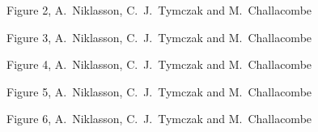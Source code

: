 \commentoutA{\documentclass[prb,aps,twocolumn,showpacs,twocolumngrid,superbib]{revtex4}}
\begin{document}
{\clearpage

\begin{center}
Figure 2, A.~Niklasson,  C.~J.~Tymczak and M.~Challacombe \\[1.cm]
\end{center}

\clearpage

\begin{center}
Figure 3, A.~Niklasson,  C.~J.~Tymczak and M.~Challacombe \\[1.cm]
\end{center}

\clearpage

\begin{center}
Figure 4, A.~Niklasson,  C.~J.~Tymczak and M.~Challacombe \\[1.cm]
\end{center}

\clearpage

\begin{center}
Figure 5, A.~Niklasson,  C.~J.~Tymczak and M.~Challacombe \\[1.cm]
\end{center}

\clearpage

\begin{center}
Figure 6, A.~Niklasson,  C.~J.~Tymczak and M.~Challacombe \\[1.cm]
\end{center}

}
\end{document}
